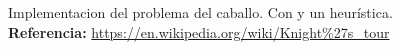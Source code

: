 Implementacion del problema del caballo. Con y un heurística.\\ \textbf{Referencia:} \url{https://en.wikipedia.org/wiki/Knight%27s_tour}